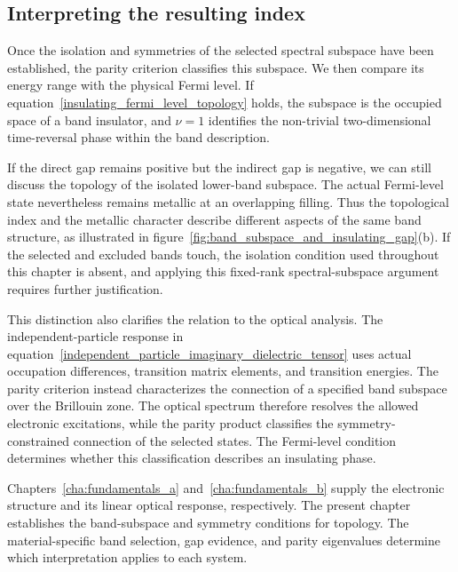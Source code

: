 \FloatBarrier
\subsection{Interpreting the resulting index}

Once the isolation and symmetries of the selected spectral subspace have been established, the parity criterion classifies this subspace.
We then compare its energy range with the physical Fermi level.
If equation~\eqref{insulating_fermi_level_topology} holds,
the subspace is the occupied space of a band insulator,
and $\nu=1$ identifies the non-trivial two-dimensional time-reversal phase within the band description.

If the direct gap remains positive but the indirect gap is negative,
we can still discuss the topology of the isolated lower-band subspace.
The actual Fermi-level state nevertheless remains metallic at an overlapping filling.
Thus the topological index and the metallic character describe different aspects of the same band structure,
as illustrated in figure~\ref{fig:band_subspace_and_insulating_gap}(b).
If the selected and excluded bands touch,
the isolation condition used throughout this chapter is absent,
and applying this fixed-rank spectral-subspace argument requires further justification.

This distinction also clarifies the relation to the optical analysis.
The independent-particle response in equation~\eqref{independent_particle_imaginary_dielectric_tensor}
uses actual occupation differences, transition matrix elements, and transition energies.
The parity criterion instead characterizes the connection of a specified band subspace over the Brillouin zone.
The optical spectrum therefore resolves the allowed electronic excitations,
while the parity product classifies the symmetry-constrained connection of the selected states.
The Fermi-level condition determines whether this classification describes an insulating phase.

Chapters~\ref{cha:fundamentals_a} and~\ref{cha:fundamentals_b} supply the electronic structure and its linear optical response, respectively.
The present chapter establishes the band-subspace and symmetry conditions for topology.
The material-specific band selection, gap evidence, and parity eigenvalues determine which interpretation applies to each system.
